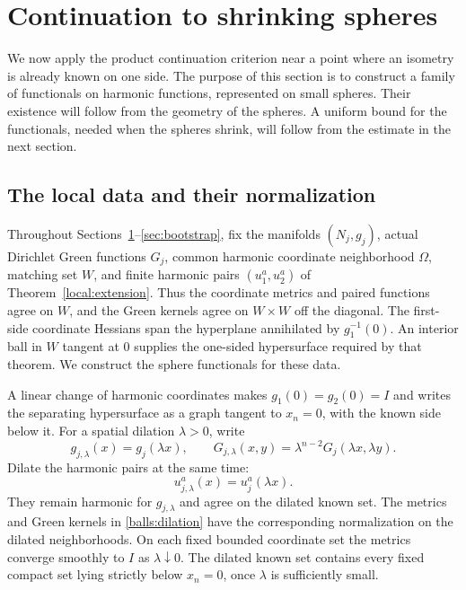 \section{Continuation to shrinking spheres}\label{sec:balls}

We now apply the product continuation criterion near a point where an
isometry is already known on one side.  The purpose of this section is to
construct a family of functionals on harmonic functions, represented on
small spheres.  Their existence will follow from the geometry of the
spheres.  A uniform bound for the functionals, needed when the spheres
shrink, will follow from the estimate in the next section.

\subsection{The local data and their normalization}
\label{balls:setup}

Throughout Sections~\ref{sec:balls}--\ref{sec:bootstrap}, fix the
manifolds $(N_j,g_j)$, actual Dirichlet Green functions $G_j$, common
harmonic coordinate neighborhood $\Omega$, matching set $W$, and finite
harmonic pairs $(u_1^a,u_2^a)$ of Theorem~\ref{local:extension}.
Thus the coordinate metrics and paired functions agree on $W$, and the
Green kernels agree on $W\times W$ off the diagonal. The first-side
coordinate Hessians span the hyperplane annihilated by $g_1^{-1}(0)$. An interior ball in
$W$ tangent at $0$ supplies the one-sided hypersurface required by
that theorem. We construct the sphere functionals for these data.

A linear change of harmonic coordinates makes $g_1(0)=g_2(0)=I$ and
writes the separating hypersurface as a graph tangent to $x_n=0$, with
the known side below it.  For a spatial
dilation $\lambda>0$, write
\begin{equation}\label{balls:dilation}
 g_{j,\lambda}(x)=g_j(\lambda x),\qquad
 G_{j,\lambda}(x,y)=\lambda^{n-2}G_j(\lambda x,\lambda y).
\end{equation}
Dilate the harmonic pairs at the same time:
\[
 u_{j,\lambda}^a(x)=u_j^a(\lambda x).
\]
They remain harmonic for $g_{j,\lambda}$ and agree on the dilated known
set. The metrics and Green kernels in \eqref{balls:dilation} have the
corresponding normalization on the dilated neighborhoods. On each fixed
bounded coordinate set the metrics converge smoothly to $I$ as $\lambda\downarrow0$.  The dilated known set
contains every fixed compact set lying strictly below $x_n=0$, once
$\lambda$ is sufficiently small.

